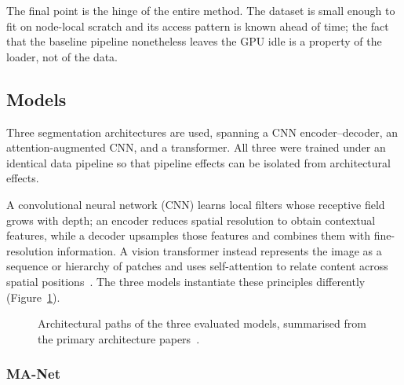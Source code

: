 The final point is the hinge of the entire method.
The dataset is small enough to fit on node-local scratch and its access pattern is
known ahead of time; the fact that the baseline pipeline nonetheless leaves the GPU
idle is a property of the loader, not of the data.

\subsection{Models}

Three segmentation architectures are used, spanning a CNN encoder--decoder, an
attention-augmented CNN, and a transformer.
All three were trained under an identical data pipeline so that pipeline effects can
be isolated from architectural effects.

A convolutional neural network (CNN) learns local filters whose receptive field
grows with depth; an encoder reduces spatial resolution to obtain contextual
features, while a decoder upsamples those features and combines them with
fine-resolution information.  A vision transformer instead represents the image
as a sequence or hierarchy of patches and uses self-attention to relate content
across spatial positions~\cite{Vaswani17,Xie21}.  The three models instantiate
these principles differently (Figure~\ref{fig:model-architectures}).

\begin{figure}[!ht]
\centering
{}
\caption{Architectural paths of the three evaluated models, summarised from the
primary architecture papers~\cite{Fan20,Chen18,Xie21}.}
\label{fig:model-architectures}
\end{figure}

\subsubsection{MA-Net}


